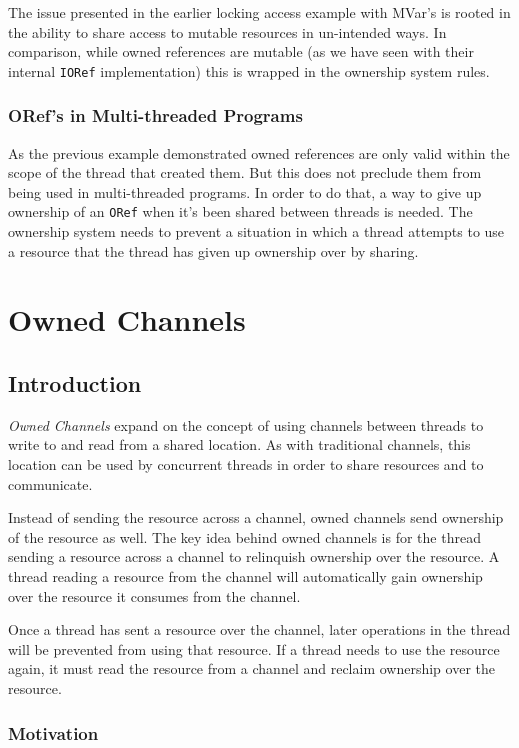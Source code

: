 \documentclass[onehalf,11pt]{beavtex}
\begin{document}
The issue presented in the earlier locking access example with MVar's is rooted
in the ability to share access to mutable resources in un-intended ways.
In comparison, while owned references are mutable (as we have seen
with their internal \texttt{IORef} implementation) this is wrapped in the
ownership system rules.

\subsection{ORef's in Multi-threaded Programs}

As the previous example demonstrated owned references are only valid within the
scope of the thread that created them.  But this does not preclude them from
being used in multi-threaded programs.
In order to do that, a way to give up ownership of an \texttt{ORef} when it's
been shared between threads is needed.
The ownership system needs to prevent a situation in which a thread attempts to
use a resource that the thread has given up ownership over by sharing. 


\chapter{Owned Channels}

\section{Introduction}

\textit{Owned Channels} expand on the concept of using channels between threads
to write to and read from a shared location.   As with traditional channels,
this location can be used by concurrent threads in order to share resources and
to communicate.

Instead of sending the resource across a channel, owned channels
send ownership of the resource as well.
The key idea behind owned channels is for the thread sending a
resource across a channel to relinquish ownership over the resource.
A thread reading a resource from the channel will automatically gain ownership
over the resource it consumes from the channel.

Once a thread has sent a resource over the channel,
later operations in the thread will be prevented from using that resource.
If a thread needs to use the resource again, it must read the
resource from a channel and reclaim ownership over the resource.

\subsection{Motivation}
\end{document}
